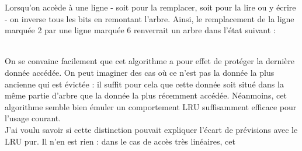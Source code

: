 \documentclass{report}
\begin{document}

Lorsqu'on accède à une ligne - soit pour la remplacer, soit pour la lire ou y écrire -
on inverse tous les bits en remontant l'arbre. Ainsi, le remplacement de la ligne
marquée 2 par une ligne marquée 6 renverrait un arbre dans l'état suivant : 
\\
\\On se convainc facilement que cet algorithme a pour effet de protéger la dernière 
donnée accédée. On peut imaginer des cas où ce n'est pas la donnée la plus ancienne
qui est évictée : il suffit pour cela que cette donnée soit situé dans la même partie
d'arbre que la donnée la plus récemment accédée. Néanmoins, cet algorithme semble
bien émuler un comportement LRU suffisamment efficace pour l'usage courant.
\\J'ai voulu savoir si cette distinction pouvait expliquer l'écart de prévisions
avec le LRU pur. Il n'en est rien : dans le cas de accès très linéaires, cet 
\end{document}

